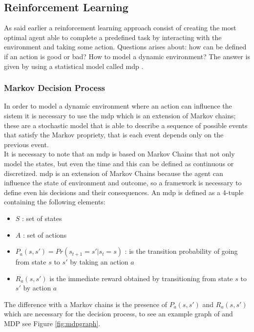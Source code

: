 \subsection{Reinforcement Learning}
As said earlier a reinforcement learning approach consist of creating the most optimal agent able to complete a predefined task by interacting with the environment and taking some action. Questions arises about: how can be defined if an action is good or bad? How to model a dynamic environment? The answer is given by using a statistical model called \acrfull{mdp} .
\subsubsection{Markov Decision Process}
In order to model a dynamic environment where an action can influence the sistem it is necessary to use the \acrfull{mdp} which is an extension of Markov chains; these are a stochastic model that is able to describe a sequence of possible events that satisfy the Markov propriety, that is each event depends only on the previous event.\\
It is necessary to note that an \acrshort{mdp} is based on Markov Chains that not only model the states, but even the time and this can be defined as continuous or discretized.
\acrshort{mdp} is an extension of Markov Chains because the agent can influence the state of environment and outcome, so a framework is necessary to define even his decisions and their consequences. An \acrshort{mdp} is defined as a 4-tuple containing the following elements:
\begin{itemize}
	\item $S$ : set of states
	\item $A$ : set of actions
	\item $P_a (s, s') = Pr(s_{t+1} = s' \vert s_{t} = s)$ : is the transition probability of going from state $s$ to $s'$ by taking an action $a$
	\item $R_{a}(s,s')$ is the immediate reward obtained by transitioning from state $s$ to $s'$ by action $a$
\end{itemize}
The difference with a Markov chains is the presence of $P_a (s, s')$ and $R_{a}(s,s')$ which are necessary for the decision process, to see an example graph of and MDP see Figure \ref{fig:mdpgraph}.
